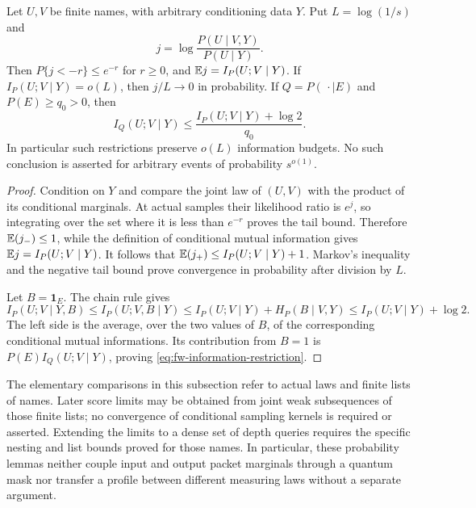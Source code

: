 \begin{lemma}
\label{lem:fw-information}
Let $U,V$ be finite names, with arbitrary conditioning data $Y$.
Put $L=\log(1/s)$ and
\[
 j=\log\frac{P(U\mid V,Y)}{P(U\mid Y)}.
\]
Then $P\{j<-r\}\le e^{-r}$ for $r\ge0$, and
$\mathbb E j=I_P(U;V\mid Y)$.  If $I_P(U;V\mid Y)=o(L)$, then
$j/L\to0$ in probability.  If $Q=P(\,\cdot\mid E)$ and
$P(E)\ge q_0>0$, then
\begin{equation}\label{eq:fw-information-restriction}
 I_Q(U;V\mid Y)
 \le\frac{I_P(U;V\mid Y)+\log2}{q_0}.
\end{equation}
In particular such restrictions preserve $o(L)$ information budgets.
No such conclusion is asserted for arbitrary events of probability
$s^{o(1)}$.
\end{lemma}

\begin{proof}
Condition on $Y$ and compare the joint law of $(U,V)$ with the
product of its conditional marginals.  At actual samples their
likelihood ratio is $e^j$, so integrating over the set where it is
less than $e^{-r}$ proves the tail bound.  Therefore
$\mathbb E(j_-)\le1$, while the definition of conditional mutual
information gives $\mathbb E j=I_P(U;V\mid Y)$.  It follows that
$\mathbb E(j_+)\le I_P(U;V\mid Y)+1$.  Markov's inequality and the negative
tail bound prove convergence in probability after division by $L$.

Let $B=\mathbf 1_E$.  The chain rule gives
\[
 I_P(U;V\mid Y,B)
 \le I_P(U;V,B\mid Y)
 \le I_P(U;V\mid Y)+H_P(B\mid V,Y)
 \le I_P(U;V\mid Y)+\log2.
\]
The left side is the average, over the two values of $B$, of the
corresponding conditional mutual informations.  Its contribution
from $B=1$ is $P(E)I_Q(U;V\mid Y)$, proving
\eqref{eq:fw-information-restriction}.
\end{proof}

The elementary comparisons in this subsection refer to actual laws
and finite lists of names.  Later score limits may be obtained from
joint weak subsequences of those finite lists; no convergence of
conditional sampling kernels is required or asserted.  Extending
the limits to a dense set of depth queries requires the specific
nesting and list bounds proved for those names.  In particular,
these probability lemmas neither couple input and output packet
marginals through a quantum mask nor transfer a profile between
different measuring laws without a separate argument.
